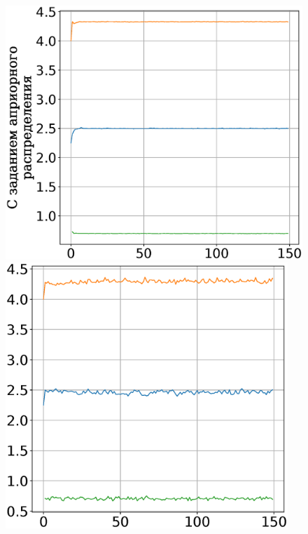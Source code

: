 \documentclass[12pt,twoside]{article}
\begin{document}
\begin{figure}[h]
\begin{minipage}{.32\textwidth}
\hspace{-3mm}
      \includegraphics[width = 1.05\textwidth]{910noise.eps}
\end{minipage}
\begin{minipage}{.32\textwidth}
\vspace{2pt}
\hspace{-2.1mm}
      \includegraphics[width = 0.95\textwidth]{911noise.eps}

\end{minipage}
\end{figure}
\end{document}
